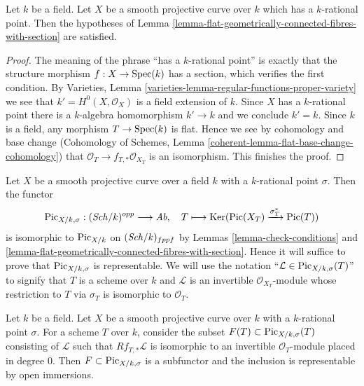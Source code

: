 \begin{lemma}
\label{lemma-check-conditions}
Let $k$ be a field. Let $X$ be a smooth projective curve over $k$
which has a $k$-rational point. Then the hypotheses of
Lemma \ref{lemma-flat-geometrically-connected-fibres-with-section}
are satisfied.
\end{lemma}

\begin{proof}
The meaning of the phrase ``has a $k$-rational point'' is exactly that
the structure morphism $f : X \to \mathop{\mathrm{Spec}}(k)$ has a section, which
verifies the first condition.
By Varieties, Lemma \ref{varieties-lemma-regular-functions-proper-variety}
we see that $k' = H^0(X, \mathcal{O}_X)$ is a field extension of $k$.
Since $X$ has a $k$-rational point there is a $k$-algebra homomorphism
$k' \to k$ and we conclude $k' = k$.
Since $k$ is a field, any morphism $T \to \mathop{\mathrm{Spec}}(k)$ is flat.
Hence we see by cohomology and base change
(Cohomology of Schemes, Lemma \ref{coherent-lemma-flat-base-change-cohomology})
that $\mathcal{O}_T \to f_{T, *}\mathcal{O}_{X_T}$ is an isomorphism.
This finishes the proof.
\end{proof}

\noindent
Let $X$ be a smooth projective curve over a field $k$ with a
$k$-rational point $\sigma$. Then the functor
$$
\mathrm{Pic}_{X/k, \sigma} : (\mathit{Sch}/k)^{opp} \longrightarrow \textit{Ab},\quad
T \longmapsto \mathop{\mathrm{Ker}}(\mathop{\mathrm{Pic}}\nolimits(X_T) \xrightarrow{\sigma_T^*} \mathop{\mathrm{Pic}}\nolimits(T))
$$
is isomorphic to $\mathrm{Pic}_{X/k}$ on $(\mathit{Sch}/k)_{fppf}$
by Lemmas \ref{lemma-check-conditions} and
\ref{lemma-flat-geometrically-connected-fibres-with-section}.
Hence it will suffice to prove that $\mathrm{Pic}_{X/k, \sigma}$
is representable. We will use the notation
``$\mathcal{L} \in \mathrm{Pic}_{X/k, \sigma}(T)$'' to signify that
$T$ is a scheme over $k$ and $\mathcal{L}$ is an invertible
$\mathcal{O}_{X_T}$-module whose restriction to $T$ via $\sigma_T$
is isomorphic to $\mathcal{O}_T$.

\begin{lemma}
\label{lemma-define-open}
Let $k$ be a field. Let $X$ be a smooth projective curve over $k$
with a $k$-rational point $\sigma$. For a scheme $T$ over $k$,
consider the subset $F(T) \subset \mathrm{Pic}_{X/k, \sigma}(T)$ consisting of
$\mathcal{L}$ such that $Rf_{T, *}\mathcal{L}$ is isomorphic to an invertible
$\mathcal{O}_T$-module placed in degree $0$. Then
$F \subset \mathrm{Pic}_{X/k, \sigma}$ is a subfunctor and the inclusion is
representable by open immersions.
\end{lemma}

